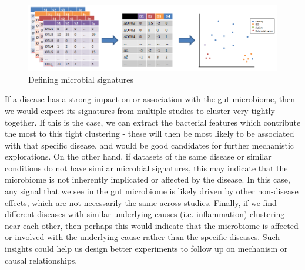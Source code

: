 \documentclass[12pt]{article}
\begin{document}
\begin{figure}
\begin{center}
\includegraphics[scale=0.5]{microbial_signatures}
\caption{Defining microbial signatures}\label{fig:microbe_signatures}
\end{center}
\end{figure}


If a disease has a strong impact on or association with the gut microbiome, then we would expect its signatures from multiple studies to cluster very tightly together. If this is the case, we can extract the bacterial features which contribute the most to this tight clustering - these will then be most likely to be associated with that specific disease, and would be good candidates for further mechanistic explorations. On the other hand, if datasets of the same disease or similar conditions do not have similar microbial signatures, this may indicate that the microbiome is not inherently implicated or affected by the disease. In this case, any signal that we see in the gut microbiome is likely driven by other non-disease effects, which are not necessarily the same across studies. Finally, if we find different diseases with similar underlying causes (i.e. inflammation) clustering near each other, then perhaps this would indicate that the microbiome is affected or involved with the underlying cause rather than the specific diseases. Such insights could help us design better experiments to follow up on mechanism or causal relationships.
\end{document}
